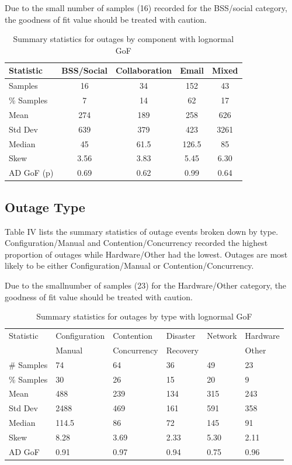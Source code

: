 \documentclass[conference]{IEEEtran}
\begin{document}
Due to the small number of samples (16) recorded for the BSS/social category, the goodness of fit value should be treated with caution. \par


\begin {table}
\caption {Summary statistics for outages by component with lognormal GoF} 
\begin{center}
\begin{tabular}{l | c | c | c | c} Statistic & BSS/Social & Collaboration & Email & Mixed
\\ \hline Samples & 16 & 34 & 152 & 43
\\ \% Samples & 7 & 14 & 62 & 17
\\ Mean & 274 & 189 & 258 & 626
\\ Std Dev & 639 & 379 & 423 & 3261
\\ Median & 45	& 61.5 & 126.5 & 85
\\ Skew & 3.56	& 3.83 & 5.45 & 6.30
\\AD GoF (p) & 0.69 & 0.62 & 0.99 & 0.64
\end{tabular}
\end{center}
\end{table}


\subsection{Outage Type}

Table IV lists the summary statistics of outage events broken down by type. Configuration/Manual and Contention/Concurrency recorded the highest proportion of outages while Hardware/Other had the lowest. Outages are most likely to be either Configuration/Manual or Contention/Concurrency. 

Due to the smallnumber of samples (23) for the Hardware/Other category, the goodness of fit value should be treated with caution. \par


\begin {table}
\caption {Summary statistics for outages by type with lognormal GoF} 
\begin{center}
\begin{tabular}{p{1.26cm} |  p{1.3cm} | p{1.3cm} | p{0.9cm} | p{0.9cm} | p{1cm}} Statistic & Configuration & Contention & Disaster & Network & Hardware
\\ & Manual & Concurrency &  Recovery & & Other
\\ \hline \# Samples & 74 & 64 & 36 & 49 & 23
\\ \% Samples & 30 & 26 & 15 & 20 & 9
\\ Mean & 488 & 239 & 134 & 	315	& 243
\\ Std Dev & 2488	& 469 & 161	& 591 	& 358
\\ Median & 114.5	& 86	& 72	& 145	& 91
\\ Skew & 8.28	& 3.69	& 2.33	& 5.30	& 2.11
\\AD GoF  & 0.91 & 0.97 & 0.94 & 0.75 & 0.96
\end{tabular}
\end{center}
\end{table}
\end{document}
